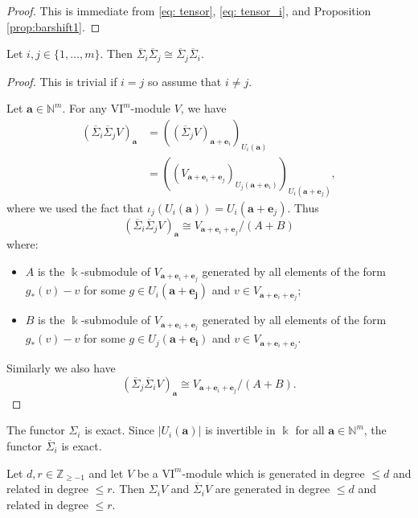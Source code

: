 \documentclass{amsart}
\numberwithin{equation}{section}
\newcommand{\N}{{\mathbb{N}}}
\newcommand{\VI}{{\mathrm{VI}}}
\newcommand{\ZZ}{{\mathbb{Z}_{\geqslant -1}}}
\newcommand{\SSigma}{{\overline{\Sigma}}}
\begin{document}
\begin{proof}
   This is immediate from \eqref{eq: tensor}, \eqref{eq: tensor_i}, and Proposition \ref{prop:barshift1}.
\end{proof}

\begin{lemma} \label{lem:modified shifts commute}
   Let $i,j\in \{1,\ldots, m\}$. Then $\SSigma_i \SSigma_j \cong \SSigma_j \SSigma_i$.
\end{lemma}

\begin{proof}
   This is trivial if $i=j$ so assume that $i\neq j$. 
   
   Let $\mathbf{a}\in \N^m$. For any $\VI^m$-module $V$, we have
   \begin{align*}
      ( \SSigma_i \SSigma_j V )_{\mathbf{a}} 
      &= ((\SSigma_j V)_{\mathbf{a}+\mathbf{e}_i})_{U_i(\mathbf{a})} \\
      &= ((V_{\mathbf{a}+\mathbf{e}_i+\mathbf{e}_j})_{U_j(\mathbf{a}+\mathbf{e}_i)})_{U_i(\mathbf{a}+\mathbf{e}_j)},
   \end{align*}
   where we used the fact that $\iota_j(U_i(\mathbf{a})) = U_i(\mathbf{a}+\mathbf{e}_j)$. Thus 
   \[ ( \SSigma_i \SSigma_j V )_{\mathbf{a}} \cong V_{\mathbf{a}+\mathbf{e}_i+\mathbf{e}_j}/ (A+B) \]
   where:
   \begin{itemize}
      \item $A$ is the $\Bbbk$-submodule of $V_{\mathbf{a}+\mathbf{e}_i+\mathbf{e}_j}$ generated by all elements of the form $g_*(v)-v$ for some $g\in U_i(\mathbf{a}+\mathbf{e_j})$ and $v\in V_{\mathbf{a}+\mathbf{e}_i+\mathbf{e}_j}$;
      \item $B$ is the $\Bbbk$-submodule of $V_{\mathbf{a}+\mathbf{e}_i+\mathbf{e}_j}$ generated by all elements of the form $g_*(v)-v$ for some $g\in U_j(\mathbf{a}+\mathbf{e_i})$ and $v\in V_{\mathbf{a}+\mathbf{e}_i+\mathbf{e}_j}$.
   \end{itemize}   
   Similarly we also have 
   \[ (\SSigma_j \SSigma_i V )_{\mathbf{a}} \cong V_{\mathbf{a}+\mathbf{e}_i+\mathbf{e}_j}/(A+B). \]
\end{proof}

\begin{remark} \label{rem: exactness sigma}
   The functor $\Sigma_i$ is exact. Since $|U_i(\mathbf{a})|$ is invertible in $\Bbbk$ for all $\mathbf{a}\in \N^m$, the functor $\SSigma_i$ is exact. 
\end{remark}

\begin{lemma} \label{lem: shift preserves d and r}
   Let $d, r\in \ZZ$ and let $V$ be a $\VI^m$-module which is generated in degree $\leqslant d$ and related in degree $\leqslant r$. Then $\Sigma_i V$ and $\SSigma_i V$ are generated in degree $\leqslant d$ and related in degree $\leqslant r$. 
\end{lemma}
\end{document}

